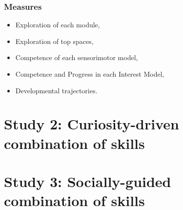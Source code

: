 \documentclass[12pt]{article}
\begin{document}
		
		\subsubsection{Measures}
		
			\begin{itemize}
				\item Exploration of each module,
				\item Exploration of top spaces,
				\item Competence of each sensorimotor model,
				\item Competence and Progress in each Interest Model,
				\item Developmental trajectories.
			\end{itemize}
			
		
	
	
%


\section{Study 2: Curiosity-driven combination of skills}
\label{study2}


%


\section{Study 3: Socially-guided combination of skills}
\label{study3}

%



\small


\end{document}

